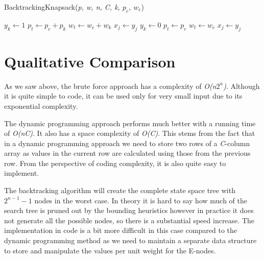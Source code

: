 \documentclass{article}
\begin{document}
\begin{algorithm}
	\caption{BacktrackingKnapsack(\textit{p, w, n, C, k, $p_{c}$, $w_{c}$})}\label{backtrackingKnapsack}
	\begin{algorithmic}[1]
			\State $y_{k} \gets 1$
				\State {}
			\EndIf
				\State $p_{t} \gets p_{c} + p_{k}$
				\State $w_{t} \gets w_{c} + w_{k}$
					\State $x_{j} \gets y_{j}$
				\EndFor
			\EndIf
		\EndIf
			\State $y_{k} \gets 0$
				\State {}
			\EndIf
				\State $p_{t} \gets p_{c}$
				\State $w_{t} \gets w_{c}$
					\State $x_{j} \gets y_{j}$
				\EndFor
			\EndIf
		\EndIf
		
	\end{algorithmic}		
\end{algorithm}

\section{Qualitative Comparison}
As we saw above, the brute force approach has a complexity of \textit{O(n$2^{n}$)}. Although it is quite simple to code, it can be used only for very small input due to its exponential complexity. 

The dynamic programming approach performs much better with a running time of \textit{O(nC)}. It also has a space complexity of \textit{O(C)}. This stems from the fact that in a dynamic programming approach we need to store two rows of a \textit{C}-column array as values in the current row are calculated using those from the previous row. From the perspective of coding complexity, it is also quite easy to implement.

The backtracking algorithm will create the complete state space tree with $2^{n-1}-1$ nodes in the worst case. In theory it is hard to say how much of the search tree is pruned out by the bounding heuristics however in practice it does not generate all the possible nodes, so there is a substantial speed increase. The implementation in code is a bit more difficult in this case compared to the dynamic programming method as we need to maintain a separate data structure to store and manipulate the values per unit weight for the E-nodes.
\end{document}
